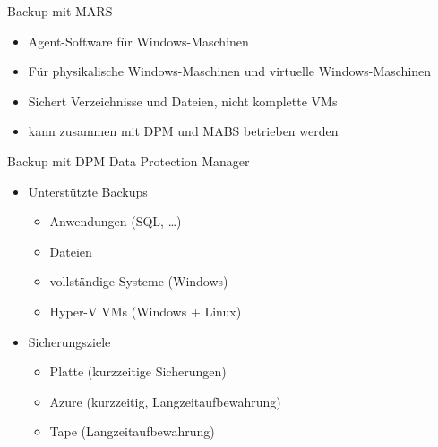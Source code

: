\begin{flashcard}[Definition]{Backup mit MARS}
    \begin{itemize}
        \item Agent-Software für Windows-Maschinen
        \item Für physikalische Windows-Maschinen und virtuelle Windows-Maschinen
        \item Sichert Verzeichnisse und Dateien, nicht komplette VMs
        \item kann zusammen mit DPM und MABS betrieben werden
    \end{itemize}
\end{flashcard}

\begin{flashcard}[Definition]{Backup mit DPM}
    Data Protection Manager
    \begin{itemize}
        \item Unterstützte Backups
            \begin{itemize}
                \item Anwendungen (SQL, \ldots)
                \item Dateien
                \item vollständige Systeme (Windows)
                \item Hyper-V VMs (Windows + Linux)
            \end{itemize}
        \item Sicherungsziele
            \begin{itemize}
                \item Platte (kurzzeitige Sicherungen)
                \item Azure (kurzzeitig, Langzeitaufbewahrung)
                \item Tape (Langzeitaufbewahrung)
            \end{itemize}
    \end{itemize}
\end{flashcard}

